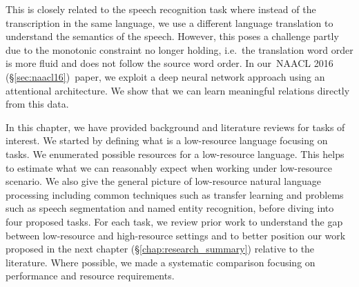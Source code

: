 \documentclass[12pt,twoside,final,hidelinks]{ltthesis}
\theoremstyle{definition}
\newcommand\naaclvi{NAACL 2016 (\S\ref{sec:naacl16})}
\begin{document}
This is closely related to the speech recognition task where instead of the transcription in the same language, we use a different language translation to understand the semantics of the speech. However, this poses a challenge partly due to the monotonic constraint no longer holding, i.e.~the translation word order is more fluid and does not follow the source word order. In our~\naaclvi\ paper, we exploit a deep neural network approach using an attentional architecture. We show that we can learn meaningful relations directly from this data.   

\vspace*{2ex}
In this chapter, we have provided background and literature reviews for tasks of interest. We started by defining what is a low-resource language focusing on tasks. We enumerated possible resources for a low-resource language. This helps to estimate what we can reasonably expect when working under low-resource scenario. We also give the general picture of low-resource natural language processing including common techniques such as transfer learning and problems such as speech segmentation and named entity recognition, before diving into four proposed tasks. For each task, we review prior work to understand the gap between low-resource and high-resource settings and to better position our work proposed in the next chapter (\S\ref{chap:research_summary}) relative to the literature. Where possible, we made a systematic  comparison focusing on performance and resource requirements. 
\end{document}

